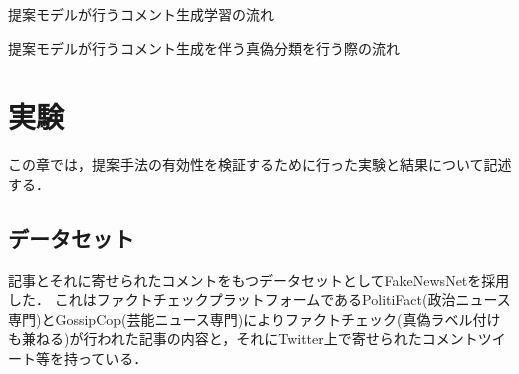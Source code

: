 \begin{algorithm}[p]
    \caption{提案モデルが行うコメント生成学習の流れ}
    \label{alg:generate}
    \begin{algorithmic}[1]
                \EndIf
                    \EndIf
                \EndFor
            \EndFor
        \EndProcedure

                    \EndWhile
                \EndFor
            \EndFor
        \EndProcedure
    \end{algorithmic}
\end{algorithm}

\begin{algorithm}
    \caption{提案モデルが行うコメント生成を伴う真偽分類を行う際の流れ}
    \label{alg:classify}
    \begin{algorithmic}[1]
            \EndFor
        \EndProcedure
    \end{algorithmic}
\end{algorithm}


\section{実験}\label{sec:gen_exp}
この章では，提案手法の有効性を検証するために行った実験と結果について記述する．

\subsection{データセット}
\label{sec:dataset}
記事とそれに寄せられたコメントをもつデータセットとしてFakeNewsNet\cite{Shu2018FakeNewsNetAD}を採用した．
これはファクトチェックプラットフォームであるPolitiFact(政治ニュース専門)とGossipCop(芸能ニュース専門)によりファクトチェック(真偽ラベル付けも兼ねる)が行われた記事の内容と，それにTwitter上で寄せられたコメントツイート等を持っている．

